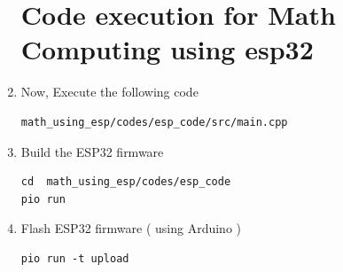 \begin{enumerate}[label=\thesection.\arabic*.,ref=\thesection.\theenumi]
\section{Code execution for Math Computing using esp32}
\raggedright
\item Now, Execute the following code
\begin{lstlisting}
math_using_esp/codes/esp_code/src/main.cpp
\end{lstlisting}
\item Build the ESP32 firmware
\begin{lstlisting}
cd  math_using_esp/codes/esp_code
pio run
\end{lstlisting} 
\item Flash ESP32 firmware ( using Arduino  )
\begin{lstlisting}
pio run -t upload
\end{lstlisting} 
\end{enumerate}

